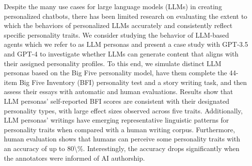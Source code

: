 Despite the many use cases for large language models (LLMs) in creating personalized chatbots, there has been limited research on evaluating the extent to which the behaviors of personalized LLMs accurately and consistently reflect specific personality traits. We consider studying the behavior of LLM-based agents which we refer to as LLM personas and present a case study with GPT-3.5 and GPT-4 to investigate whether LLMs can generate content that aligns with their assigned personality profiles. To this end, we simulate distinct LLM personas based on the Big Five personality model, have them complete the 44-item Big Five Inventory (BFI) personality test and a story writing task, and then assess their essays with automatic and human evaluations. Results show that LLM personas' self-reported BFI scores are consistent with their designated personality types, with large effect sizes observed across five traits. Additionally, LLM personas' writings have emerging representative linguistic patterns for personality traits when compared with a human writing corpus. Furthermore, human evaluation shows that humans can perceive some personality traits with an accuracy of up to 80\textbackslash{}\%. Interestingly, the accuracy drops significantly when the annotators were informed of AI authorship.